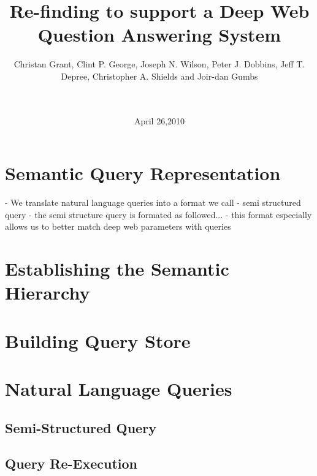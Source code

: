 \documentclass{www2010-submission}
\begin{document}
\title{Re-finding to support a Deep Web Question Answering System} 
\author{
	 \alignauthor Christan Grant, Clint P. George, Joseph N. Wilson, Peter J. Dobbins, Jeff T. Depree, Christopher A. Shields and Joir-dan Gumbs\\
	  \\  \\
}
\date{April 26,2010}

\maketitle







\section{Semantic Query Representation}
- We translate natural language queries into a format we call - semi structured query
- the semi structure query is formated as followed...
- this format especially allows us to better match deep web parameters with queries

\section{Establishing the Semantic Hierarchy}






\section{Building Query Store}





\section{Natural Language Queries}
\subsection{Semi-Structured Query}




\subsection{Query Re-Execution}





%

\end{document}
